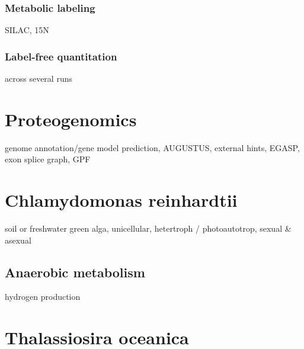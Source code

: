 \documentclass[11pt,a4paper,twoside]{report}
\begin{document}
\subsubsection{Metabolic labeling}

\begin{todo}
SILAC, 15N
\end{todo}

\subsubsection{Label-free quantitation}

\begin{todo}
across several runs
\end{todo}

\section{Proteogenomics}

\begin{todo}
genome annotation/gene model prediction, AUGUSTUS, external hints, 
EGASP, exon splice graph, GPF
\end{todo}

\section{Chlamydomonas reinhardtii}

\begin{todo}
soil or freshwater green alga, unicellular, hetertroph / photoautotrop, sexual & asexual
\end{todo}

\subsection{Anaerobic metabolism}

\begin{todo}
hydrogen production
\end{todo}

\section{Thalassiosira oceanica}
\end{document}
